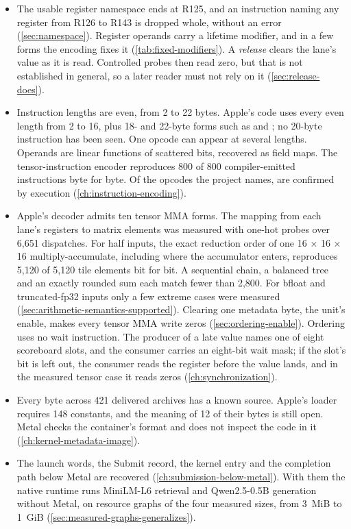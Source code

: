 \begin{itemize}
\item The usable register namespace ends at R125, and an instruction naming any register from R126 to R143
  is dropped whole, without an error (\cref{sec:namespace}). Register operands carry a lifetime modifier, and in a few
  forms the encoding fixes it (\cref{tab:fixed-modifiers}). A \emph{release} clears the lane's value as it is read.
  Controlled probes then read zero, but that is not established in general, so a later reader must not rely on it
  (\cref{sec:release-does}).
\item Instruction lengths are even, from 2 to 22 bytes. Apple's code uses every even length from 2 to 16, plus 18- and
  22-byte forms such as  and ; no 20-byte instruction has been seen. One opcode can appear at several
  lengths. Operands are linear functions of
  scattered bits, recovered as field maps. The tensor-instruction encoder reproduces 800 of 800 compiler-emitted
  instructions byte for byte. Of the  opcodes the project names,  are confirmed by execution
  (\cref{ch:instruction-encoding}).
\item Apple's decoder admits ten tensor MMA forms. The mapping from each lane's registers to matrix elements
  was measured with one-hot probes over 6,651 dispatches. For half inputs, the exact reduction order of one 16 × 16 × 16
  multiply-accumulate, including where the accumulator enters, reproduces 5,120 of 5,120 tile elements bit for bit.
  A sequential chain, a balanced tree and an exactly rounded sum each match fewer than 2,800. For bfloat and
  truncated-fp32 inputs only a few extreme cases were measured (\cref{sec:arithmetic-semantics-supported}). Clearing one
  metadata byte, the unit's enable, makes every tensor MMA write zeros (\cref{sec:ordering-enable}). Ordering uses no
  wait instruction. The producer of a late value names one of eight scoreboard slots, and the consumer carries an
  eight-bit wait mask; if the slot's bit is left out, the consumer reads the register before the value lands, and in
  the measured tensor case it reads zeros (\cref{ch:synchronization}).
\item Every byte across 421 delivered archives has a known source. Apple's loader requires 148
  constants, and the meaning of 12 of their bytes is still open. Metal checks the container's format and does not inspect the code in it (\cref{ch:kernel-metadata-image}).
\item The launch words, the Submit record, the kernel entry and the completion path below Metal are recovered
  (\cref{ch:submission-below-metal}). With them the native runtime runs MiniLM-L6 retrieval and Qwen2.5-0.5B generation
  without Metal, on resource graphs of the four measured sizes, from 3~MiB to 1~GiB (\cref{sec:measured-graphs-generalizes}).
\end{itemize}

